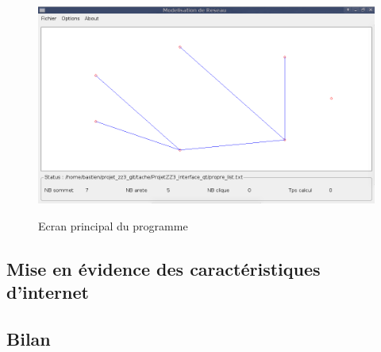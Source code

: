 \begin{figure}[H]
\centering
 \fbox
 {
 \includegraphics[width=16cm]{./schema/capture_ecran_graph.png}
 }
  \caption{\label{ecran_graph}Ecran principal du programme}
\end{figure}

\subsection{Mise en évidence des caractéristiques d'internet}

\subsection{Bilan}
